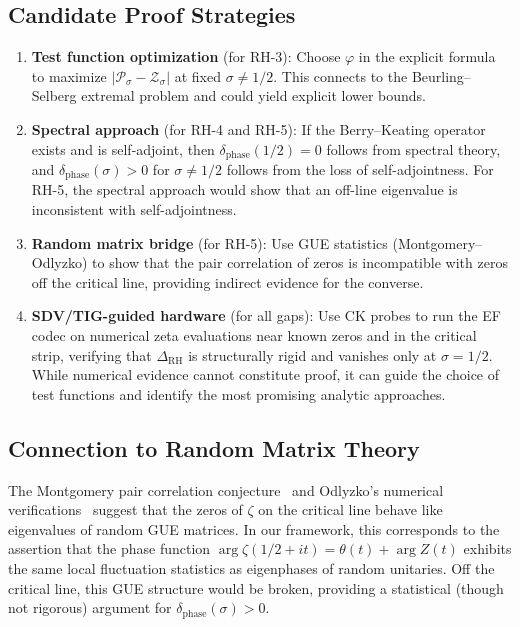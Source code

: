 \documentclass[11pt]{article}
\theoremstyle{remark}
\begin{document}
\subsection{Candidate Proof Strategies}

\begin{enumerate}
  \item \textbf{Test function optimization} (for RH-3):
    Choose $\varphi$ in the explicit formula to maximize
    $|\mathcal{P}_\sigma-\mathcal{Z}_\sigma|$ at fixed $\sigma\neq 1/2$.
    This connects to the Beurling--Selberg extremal problem and could yield
    explicit lower bounds.

  \item \textbf{Spectral approach} (for RH-4 and RH-5):
    If the Berry--Keating operator exists and is self-adjoint, then
    $\delta_{\mathrm{phase}}(1/2)=0$ follows from spectral theory, and
    $\delta_{\mathrm{phase}}(\sigma)>0$ for $\sigma\neq 1/2$ follows from the loss
    of self-adjointness.
    For RH-5, the spectral approach would show that an off-line eigenvalue is
    inconsistent with self-adjointness.

  \item \textbf{Random matrix bridge} (for RH-5):
    Use GUE statistics (Montgomery--Odlyzko) to show that the pair correlation of
    zeros is incompatible with zeros off the critical line, providing indirect
    evidence for the converse.

  \item \textbf{SDV/TIG-guided hardware} (for all gaps):
    Use CK probes to run the EF codec on numerical zeta evaluations near known
    zeros and in the critical strip, verifying that $\Delta_{\mathrm{RH}}$ is
    structurally rigid and vanishes only at $\sigma=1/2$.
    While numerical evidence cannot constitute proof, it can guide the choice of
    test functions and identify the most promising analytic approaches.
\end{enumerate}

\subsection{Connection to Random Matrix Theory}

The Montgomery pair correlation conjecture~\cite{Mont} and Odlyzko's numerical
verifications~\cite{Odl} suggest that the zeros of $\zeta$ on the critical line
behave like eigenvalues of random GUE matrices.
In our framework, this corresponds to the assertion that the phase function
$\arg\zeta(1/2+it)=\theta(t)+\arg Z(t)$ exhibits the same local fluctuation
statistics as eigenphases of random unitaries.
Off the critical line, this GUE structure would be broken, providing a statistical
(though not rigorous) argument for $\delta_{\mathrm{phase}}(\sigma)>0$.
\end{document}

